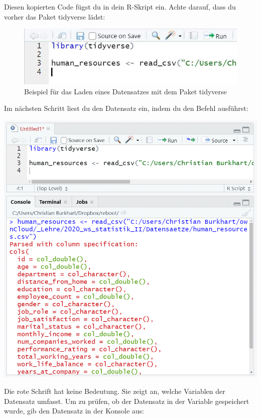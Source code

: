 \documentclass[
]{book}
\begin{document}
Diesen kopierten Code fügst du in dein R-Skript ein. Achte darauf, dass du vorher das Paket tidyverse lädst:~

\begin{figure}
\centering
\includegraphics{images/02_grundlagen/load_dataset.jpg}
\caption{Beispiel für das Laden eines Datensatzes mit dem Paket tidyverse}
\end{figure}

Im nächsten Schritt liest du den Datensatz ein, indem du den Befehl ausführst:

\includegraphics{images/02_grundlagen/load_data1.png}

Die rote Schrift hat keine Bedeutung. Sie zeigt an, welche Variablen der Datensatz umfasst. Um zu prüfen, ob der Datensatz in der Variable gespeichert wurde, gib den Datensatz in der Konsole aus:
\end{document}
